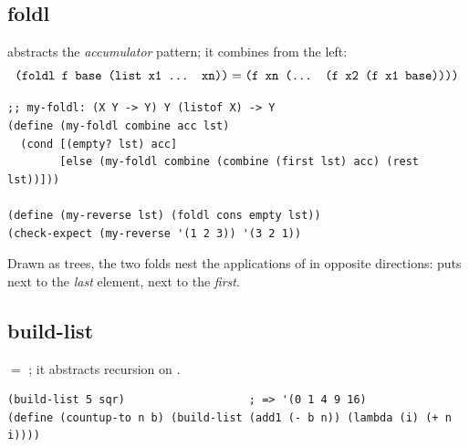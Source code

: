 \subsection{foldl}
 abstracts the \emph{accumulator} pattern; it combines from the left:
\[ \texttt{(foldl f base (list x1 ... xn))} = \texttt{(f xn (... (f x2 (f x1 base))))} \]
\begin{lstlisting}[style=racket]
;; my-foldl: (X Y -> Y) Y (listof X) -> Y
(define (my-foldl combine acc lst)
  (cond [(empty? lst) acc]
        [else (my-foldl combine (combine (first lst) acc) (rest lst))]))

(define (my-reverse lst) (foldl cons empty lst))
(check-expect (my-reverse '(1 2 3)) '(3 2 1))
\end{lstlisting}

Drawn as trees, the two folds nest the applications of  in opposite
directions:  puts  next to the \emph{last} element,
 next to the \emph{first}.

\begin{center}
\end{center}

\subsection{build-list}
 $=$ ; it abstracts recursion on .
\begin{lstlisting}[style=racket]
(build-list 5 sqr)                   ; => '(0 1 4 9 16)
(define (countup-to n b) (build-list (add1 (- b n)) (lambda (i) (+ n i))))
\end{lstlisting}

